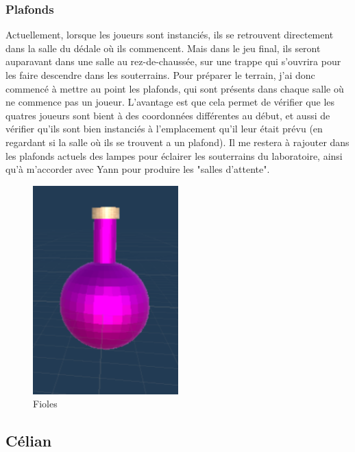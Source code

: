 \documentclass{article}
\begin{document}
\subsubsection{Plafonds}

Actuellement, lorsque les joueurs sont instanciés, ils se retrouvent directement dans la salle du dédale où ils commencent. Mais dans le jeu final, ils seront auparavant dans une salle au rez-de-chaussée, sur une trappe qui s'ouvrira pour les faire descendre dans les souterrains. Pour préparer le terrain, j'ai donc commencé à mettre au point les plafonds, qui sont présents dans chaque salle où ne commence pas un joueur. L'avantage est que cela permet de vérifier que les quatres joueurs sont bient à des coordonnées différentes au début, et aussi de vérifier qu'ils sont bien instanciés à l'emplacement qu'il leur était prévu (en regardant si la salle où ils se trouvent a un plafond).
Il me restera à rajouter dans les plafonds actuels des lampes pour éclairer les souterrains du laboratoire, ainsi qu'à m'accorder avec Yann pour produire les "salles d'attente".

\par\vspace{0.5cm}
\begin{figure}[!ht]
    \centering
    \includegraphics[width=0.5\textwidth]{Fioles.PNG}
    \caption{Fioles}
    \label{Fioles}
\end{figure}{}





\clearpage
\subsection{Célian}
\end{document}
